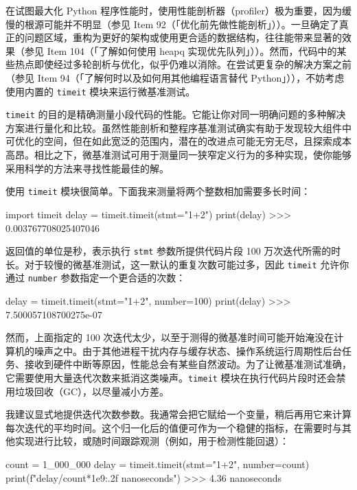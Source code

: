 在试图最大化 Python 程序性能时，使用性能剖析器（profiler）极为重要，因为缓慢的根源可能并不明显（参见 Item 92（「优化前先做性能剖析」））。一旦确定了真正的问题区域，重构为更好的架构或使用更合适的数据结构，往往能带来显著的效果（参见 Item 104（「了解如何使用 heapq 实现优先队列」））。然而，代码中的某些热点即使经过多轮剖析与优化，似乎仍难以消除。在尝试更复杂的解决方案之前（参见 Item 94（「了解何时以及如何用其他编程语言替代 Python」）），不妨考虑使用内置的 \texttt{timeit} 模块来运行微基准测试。

\texttt{timeit} 的目的是精确测量小段代码的性能。它能让你对同一明确问题的多种解决方案进行量化和比较。虽然性能剖析和整程序基准测试确实有助于发现较大组件中可优化的空间，但在如此宽泛的范围内，潜在的改进点可能无穷无尽，且探索成本高昂。相比之下，微基准测试可用于测量同一狭窄定义行为的多种实现，使你能够采用科学的方法来寻找性能最佳的解。

使用 \texttt{timeit} 模块很简单。下面我来测量将两个整数相加需要多长时间：

\begin{codebox}[python]
import timeit
delay = timeit.timeit(stmt="1+2")
print(delay)
>>>
0.003767708025407046
\end{codebox}

返回值的单位是秒，表示执行 \texttt{stmt} 参数所提供代码片段 100 万次迭代所需的时长。对于较慢的微基准测试，这一默认的重复次数可能过多，因此 \texttt{timeit} 允许你通过 \texttt{number} 参数指定一个更合适的次数：

\begin{codebox}[python]
delay = timeit.timeit(stmt="1+2", number=100)
print(delay)
>>>
7.500057108700275e-07
\end{codebox}

然而，上面指定的 100 次迭代太少，以至于测得的微基准时间可能开始淹没在计算机的噪声之中。由于其他进程干扰内存与缓存状态、操作系统运行周期性后台任务、接收到硬件中断等原因，性能总会有某些自然波动。为了让微基准测试准确，它需要使用大量迭代次数来抵消这类噪声。\texttt{timeit} 模块在执行代码片段时还会禁用垃圾回收（GC），以尽量减小方差。

我建议显式地提供迭代次数参数。我通常会把它赋给一个变量，稍后再用它来计算每次迭代的平均时间。这个归一化后的值便可作为一个稳健的指标，在需要时与其他实现进行比较，或随时间跟踪观测（例如，用于检测性能回退）：

\begin{codebox}[python]
count = 1_000_000
delay = timeit.timeit(stmt="1+2", number=count)
print(f"{delay/count*1e9:.2f} nanoseconds")
>>>
4.36 nanoseconds
\end{codebox}

